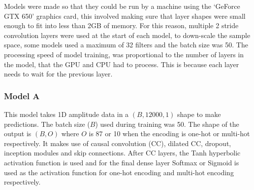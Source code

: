 \documentclass[12pt]{article}
\begin{document}
    Models were made so that they could be run by a machine using the `GeForce GTX 650' graphics card, this involved making sure that layer shapes were small enough to fit into less than 2GB of memory. For this reason, multiple 2 stride convolution layers were used at the start of each model, to down-scale the sample space, some models used a maximum of 32 filters and the batch size was 50. The processing speed of model training, was proportional to the number of layers in the model, that the GPU and CPU had to process. This is because each layer needs to wait for the previous layer.\medskip
    
    \subsubsection{Model A}
    \label{sec:design_modelA}
    
    This model takes 1D amplitude data in a $(B, 12000, 1)$ shape to make predictions. The batch size ($B$) used during training was 50. The shape of the output is $(B, O)$ where $O$ is 87 or 10 when the encoding is one-hot or multi-hot respectively. It makes use of causal convolution (CC), dilated CC, dropout, inception modules and skip connections. After CC layers, the Tanh hyperbolic activation function is used and for the final dense layer Softmax or Sigmoid is used as the activation function for one-hot encoding and multi-hot encoding respectively.\medskip
\end{document}
